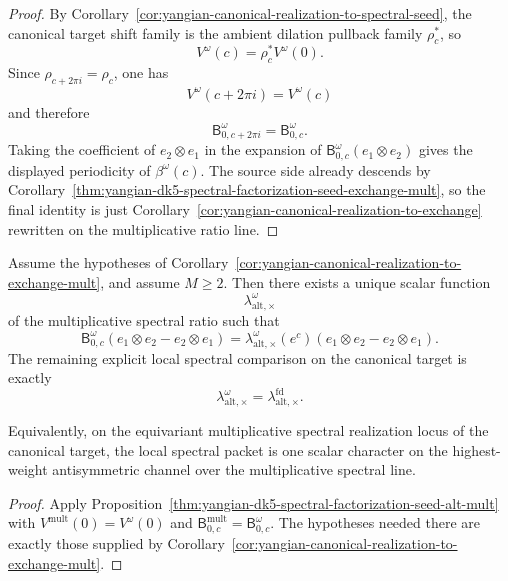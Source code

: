 \begin{proof}
By
Corollary~\ref{cor:yangian-canonical-realization-to-spectral-seed},
the canonical target shift family is the ambient dilation pullback
family \(\rho_c^*\), so
\[
V^\omega(c)=\rho_c^*V^\omega(0).
\]
Since \(\rho_{c+2\pi i}=\rho_c\), one has
\[
V^\omega(c+2\pi i)=V^\omega(c)
\]
and therefore
\[
\mathsf B_{0,c+2\pi i}^{\omega}
=
\mathsf B_{0,c}^{\omega}.
\]
Taking the coefficient of \(e_2\otimes e_1\) in the expansion of
\(\mathsf B_{0,c}^{\omega}(e_1\otimes e_2)\) gives the displayed
periodicity of \(\beta^\omega(c)\). The source side already descends
by
Corollary~\ref{thm:yangian-dk5-spectral-factorization-seed-exchange-mult},
so the final identity is just
Corollary~\ref{cor:yangian-canonical-realization-to-exchange}
rewritten on the multiplicative ratio line.
\end{proof}

\begin{corollary}
\label{cor:yangian-canonical-realization-to-alt-mult}
Assume the hypotheses of
Corollary~\ref{cor:yangian-canonical-realization-to-exchange-mult}, and
assume \(M\ge 2\). Then there exists a unique scalar function
\[
\lambda_{\mathrm{alt},\times}^{\omega}
\]
of the multiplicative spectral ratio such that
\[
\mathsf B_{0,c}^{\omega}
(e_1\otimes e_2-e_2\otimes e_1)
=
\lambda_{\mathrm{alt},\times}^{\omega}(e^c)
(e_1\otimes e_2-e_2\otimes e_1).
\]
The remaining explicit local spectral comparison on the canonical
target is exactly
\[
\lambda_{\mathrm{alt},\times}^{\omega}
=
\lambda_{\mathrm{alt},\times}^{\mathrm{fd}}.
\]

Equivalently, on the equivariant multiplicative spectral realization
locus of the canonical target, the local spectral packet is one scalar
character on the highest-weight antisymmetric channel over the
multiplicative spectral line.
\end{corollary}

\begin{proof}
Apply
Proposition~\ref{thm:yangian-dk5-spectral-factorization-seed-alt-mult}
with \(V^{\mathrm{mult}}(0)=V^\omega(0)\) and
\(\mathsf B_{0,c}^{\mathrm{mult}}=\mathsf B_{0,c}^{\omega}\). The
hypotheses needed there are exactly those supplied by
Corollary~\ref{cor:yangian-canonical-realization-to-exchange-mult}.
\end{proof}

